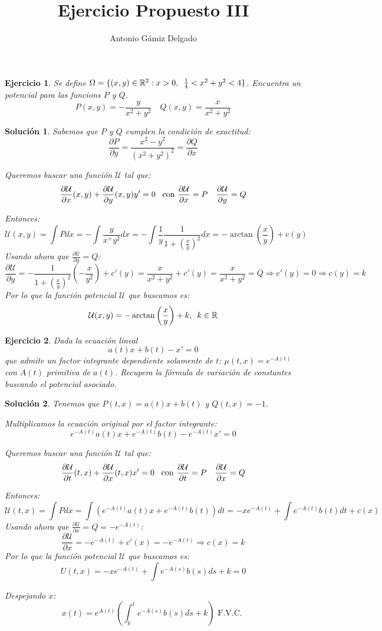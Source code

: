\documentclass[12pt]{article}
\newcommand{\R}[1][]{\mathbb{R}^{#1}}
\newcommand{\U}{\mathcal{U}}
\newtheorem*{theorem*}{Ejercicio}
\newtheorem*{proof*}{Solución}
\newcommand{\p}[2]{\frac{\partial#1}{\partial#2}}
\begin{document}

\author{Antonio Gámiz Delgado}
\title{Ejercicio Propuesto III}
\maketitle


\begin{theorem*}
Se define $\Omega=\{(x,y)\in\R[2]:x>0, \enskip \frac{1}{4}<x^2+y^2<4\}$. Encuentra un potencial para las funcions $P$ y $Q$.
\[
P(x,y)=-\frac{y}{x^2+y^2} \quad Q(x,y)=\frac{x}{x^2+y^2}
\]
\end{theorem*}

\begin{proof*}
Sabemos que $P$ y $Q$ cumplen la condición de exactitud:
\[
\p{P}{y}=\frac{x^2-y^2}{(x^2+y^2)^2}=\p{Q}{x}
\]

Queremos buscar una función $\U$ tal que:
\[
\p{\U}{x}(x,y)+\p{\U}{y}(x,y)y'=0 \enskip \text{ con } \p{\U}{x}=P \quad \p{\U}{y}=Q
\]

Entonces:
\[
\U(x,y)=\int Pdx=-\int \frac{y}{x^+y^2}dx=-\int \frac{1}{y}\frac{1}{1+(\frac{x}{y})^2}dx=-\arctan\left(\frac{x}{y}\right)+c(y) 
\]
Usando ahora que $\displaystyle\p{\U}{y}=Q$:
\[
\p{\U}{y}=-\frac{1}{1+(\frac{x}{y})^2}\left(-\frac{x}{y^2}\right)+c'(y)=\frac{x}{x^2+y^2}+c'(y)=\frac{x}{x^2+y^2}=Q \Longrightarrow c'(y)=0 \Longrightarrow c(y)=k
\]
Por lo que la función potencial $\U$ que buscamos es:
\[
\U(x,y)=-\arctan\left(\frac{x}{y}\right)+k, \enskip k\in\R
\]
\end{proof*}

\newpage

\begin{theorem*}
Dada la ecuación lineal
\[
a(t)x+b(t)-x'=0
\]
que admite un factor integrante dependiente solamente de $t$: $\mu(t,x)=e^{-A(t)}$ con $A(t)$ primitiva de $a(t)$. Recupera la fórmula de variación de constantes buscando el potencial asociado.
\end{theorem*}
\begin{proof*}
Tenemos que $P(t,x)=a(t)x+b(t)$ y $Q(t,x)=-1$.

Multiplicamos la ecuación original por el factor integrante:
\[
e^{-A(t)}a(t)x+e^{-A(t)}b(t)-e^{-A(t)}x'=0
\]

Queremos buscar una función $\U$ tal que:
\[
\p{\U}{t}(t,x)+\p{\U}{x}(t,x)x'=0 \enskip \text{ con } \p{\U}{t}=P \quad \p{\U}{x}=Q
\]

Entonces:
\[
\U(t,x)=\int Pdx= \int\left(e^{-A(t)}a(t)x+e^{-A(t)}b(t)\right)dt=-xe^{-A(t)}+\int e^{-A(t)}b(t)dt+c(x)
\]
Usando ahora que $\displaystyle\p{\U}{x}=Q=-e^{-A(t)}$:
\[
\p{\U}{x}=-e^{-A(t)}+c'(x)=-e^{-A(t)}\Longrightarrow c(x)=k
\]
Por lo que la función potencial $\U$ que buscamos es:
\[
U(t,x)=-xe^{-A(t)}+\int e^{-A(s)}b(s)ds+k=0
\]

Despejando $x$:
\[
x(t)=e^{A(t)}\left(\int^t_k e^{-A(s)}b(s)ds+k\right) \text{ F.V.C. }
\]
\end{proof*}
\end{document}
